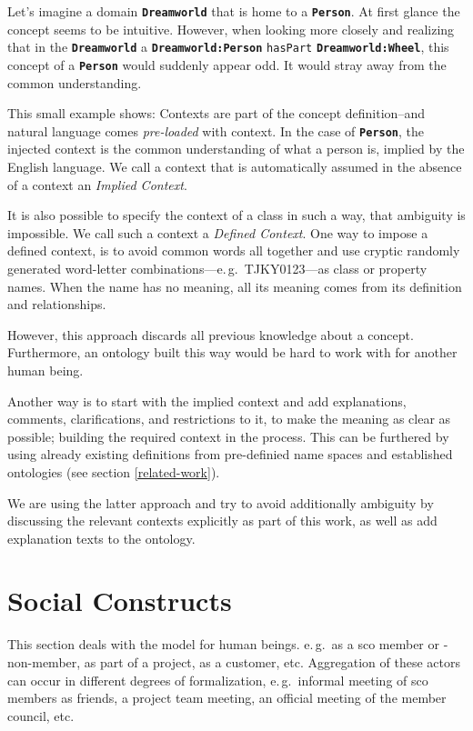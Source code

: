 \documentclass[a4paper, DIV=13, BCOR=0cm]{scrbook}
\newcommand{\eg}{e.\,g.\ }
\newcommand{\class}[1]{\texttt{\textbf{#1}}}
\newcommand{\relation}[1]{\texttt{#1}}
\begin{document}
Let's imagine a domain \class{Dreamworld} that is home to a \class{Person}. At first glance the concept seems to be intuitive. However, when looking more closely and realizing that in the \class{Dreamworld} a \class{Dreamworld:Person} \relation{hasPart} \class{Dreamworld:Wheel}, this concept of a \class{Person} would suddenly appear odd. It would stray away from the common understanding.

This small example shows: Contexts are part of the concept definition--and natural language comes \textit{pre-loaded} with context. In the case of \class{Person}, the injected context is the common understanding of what a person is, implied by the English language. We call a context that is automatically assumed in the absence of a context an \textit{Implied Context}.

It is also possible to specify the context of a class in such a way, that ambiguity is impossible. We call such a context a \textit{Defined Context}. One way to impose a defined context, is to avoid common words all together and use cryptic randomly generated word-letter combinations---\eg TJKY0123---as class or property names. When the name has no meaning, all its meaning comes from its definition and relationships.

However, this approach discards all previous knowledge about a concept. Furthermore, an ontology built this way would be hard to work with for another human being.

Another way is to start with the implied context and add explanations, comments, clarifications, and restrictions to it, to make the meaning as clear as possible; building the required context in the process. This can be furthered by using already existing definitions from pre-definied name spaces and established ontologies (see section \ref{related-work}).

We are using the latter approach and try to avoid additionally ambiguity by discussing the relevant contexts explicitly as part of this work, as well as add explanation texts to the ontology.

\section{Social Constructs }
 This section deals with the model for human beings.
 \eg as a \gls{sco} member or -non-member, as part of a project, as a customer, etc.
 Aggregation of these actors can occur in different degrees of formalization, \eg informal meeting of \gls{sco} members as friends, a project team meeting, an official meeting of the member council, etc. 
\end{document}
